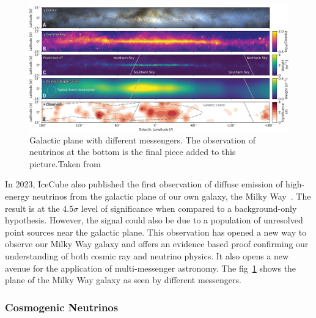   \begin{figure}[t!]
    \centering
    \includegraphics[width=14.5cm]{thesis_figures/CRnNu/science-adc9818-f1.jpg}
    \caption{Galactic plane with different messengers. The observation of neutrinos at the bottom is the final piece added to this picture.Taken from~\cite{Galactic_plane_nu_2023}}
    \label{fig:Galactic_plane_nu_messengers}
  \end{figure}

  In 2023, IceCube also published the first observation of diffuse emission of high-energy neutrinos from the galactic plane of our own galaxy, the Milky Way~\cite{Galactic_plane_nu_2023}. The result is at the 4.5$\sigma$ level of significance when compared to a background-only hypothesis. However, the signal could also be due to a population of unresolved point sources near the galactic plane. This observation has opened a new way to observe our Milky Way galaxy and offers an evidence based proof confirming our understanding of both cosmic ray and neutrino physics. It also opens a new avenue for the application of multi-messenger astronomy. The fig~\ref{fig:Galactic_plane_nu_messengers} shows the plane of the Milky Way galaxy as seen by different messengers.
  
\subsubsection*{Cosmogenic Neutrinos}


